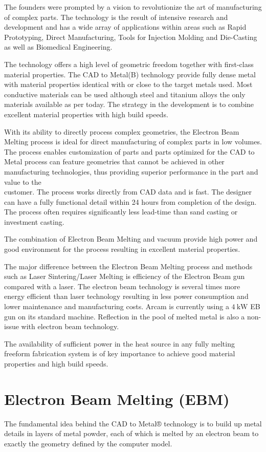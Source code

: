 \documentclass[10pt]{article}
\begin{document}
The founders were prompted by a vision to revolutionize the art of manufacturing of complex parts. The technology is the result of intensive research and development and has a wide array of applications within areas such as Rapid Prototyping, Direct Manufacturing, Tools for Injection Molding and Die-Casting as well as Biomedical Engineering.

The technology offers a high level of geometric freedom together with first-class material properties. The CAD to Metal(B) technology provide fully dense metal with material properties identical with or close to the target metals used. Most conductive materials can be used although steel and titanium alloys the only materials available as per today. The strategy in the development is to combine excellent material properties with high build speeds.

With its ability to directly process complex geometries, the Electron Beam Melting process is ideal for direct manufacturing of complex parts in low volumes. The process enables customization of parts and parts optimized for the CAD to Metal process can feature geometries that cannot be achieved in other manufacturing technologies, thus providing superior performance in the part and value to the\\
customer. The process works directly from CAD data and is fast. The designer can have a fully functional detail within 24 hours from completion of the design. The process often requires significantly less lead-time than sand casting or investment casting.

The combination of Electron Beam Melting and vacuum provide high power and good environment for the process resulting in excellent material properties.

The major difference between the Electron Beam Melting process and methods such as Laser Sintering/Laser Melting is efficiency of the Electron Beam gun compared with a laser. The electron beam technology is several times more energy efficient than laser technology resulting in less power consumption and lower maintenance and manufacturing costs. Arcam is currently using a $4 \mathrm{~kW}$ EB gun on its standard machine. Reflection in the pool of melted metal is also a non-issue with electron beam technology.

The availability of sufficient power in the heat source in any fully melting freeform fabrication system is of key importance to achieve good material properties and high build speeds.

\section*{Electron Beam Melting (EBM)}
The fundamental idea behind the CAD to Metal® technology is to build up metal details in layers of metal powder, each of which is melted by an electron beam to exactly the geometry defined by the computer model.
\end{document}
